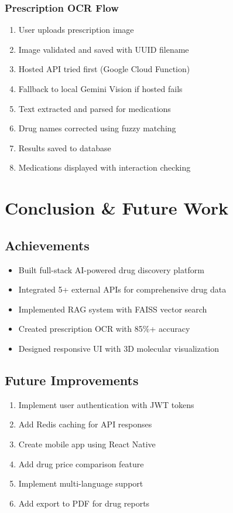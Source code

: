 \documentclass[12pt,a4paper]{report}
\begin{document}
\subsection{Prescription OCR Flow}
\begin{enumerate}
    \item User uploads prescription image
    \item Image validated and saved with UUID filename
    \item Hosted API tried first (Google Cloud Function)
    \item Fallback to local Gemini Vision if hosted fails
    \item Text extracted and parsed for medications
    \item Drug names corrected using fuzzy matching
    \item Results saved to database
    \item Medications displayed with interaction checking
\end{enumerate}

\newpage

\chapter{Conclusion \& Future Work}

\section{Achievements}
\begin{itemize}
    \item Built full-stack AI-powered drug discovery platform
    \item Integrated 5+ external APIs for comprehensive drug data
    \item Implemented RAG system with FAISS vector search
    \item Created prescription OCR with 85\%+ accuracy
    \item Designed responsive UI with 3D molecular visualization
\end{itemize}

\section{Future Improvements}
\begin{enumerate}
    \item Implement user authentication with JWT tokens
    \item Add Redis caching for API responses
    \item Create mobile app using React Native
    \item Add drug price comparison feature
    \item Implement multi-language support
    \item Add export to PDF for drug reports
\end{enumerate}
\end{document}
